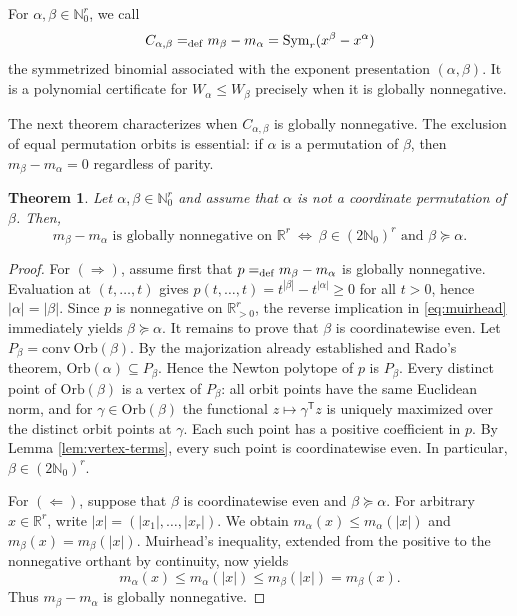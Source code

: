 \documentclass[11pt]{article}
\newtheorem{theorem}[definition]{Theorem}
\newcommand{\Nat}{\mathbb{N}}
\newcommand{\Real}{\mathbb{R}}
\newcommand{\conv}{\mathrm{conv}}
\newcommand{\Orb}{\mathrm{Orb}}
\theoremstyle{remark}
\begin{document}
For $\alpha,\beta\in\mathbb N_0^r$, we call
\[
 C_{\alpha,\beta}
 =_{\rm def} m_\beta-m_\alpha
 =\operatorname{Sym}_r(x^\beta-x^\alpha)
\]
the symmetrized binomial associated with the exponent
presentation $(\alpha,\beta)$. It is a polynomial certificate for
$W_\alpha\leq W_\beta$ precisely when it is globally nonnegative.

The next theorem characterizes when $C_{\alpha,\beta}$ is globally nonnegative.
The exclusion of equal permutation orbits is essential: if $\alpha$ is a permutation of $\beta$, then $m_\beta-m_\alpha=0$ regardless of parity.

\begin{theorem}
\label{thm:characterization}
Let $\alpha,\beta\in\Nat_0^r$ and assume that $\alpha$ is not a coordinate permutation of $\beta$.  Then, 
\[
m_\beta-m_\alpha \textrm{ is globally nonnegative on $\Real^r$}
~\Longleftrightarrow~ 
\beta\in(2\Nat_0)^r \textrm{ and $\beta\succeq\alpha$}.
\]
\end{theorem}

\begin{proof}
For $(\Rightarrow)$, assume first that $p=_{\rm def} m_\beta-m_\alpha$ is globally nonnegative. Evaluation at $(t,\ldots,t)$ gives
$p(t,\ldots,t)=t^{|\beta|}-t^{|\alpha|}\geq 0$ for all $t>0$, 
hence $|\alpha|=|\beta|$.  Since $p$ is nonnegative on
$\Real_{>0}^r$, the reverse implication in \eqref{eq:muirhead}
immediately yields $\beta\succeq\alpha$.
It remains to prove that $\beta$ is coordinatewise even.
Let $P_\beta=\conv\ \Orb(\beta)$.  By the majorization already
established and Rado's theorem, $\Orb(\alpha)\subseteq P_\beta$. Hence the Newton polytope of $p$ is $P_\beta$.  Every distinct point of $\Orb(\beta)$ is a vertex of $P_\beta$: all orbit points have the same Euclidean norm, and for
$\gamma\in\Orb(\beta)$ the functional $z\mapsto\gamma^{\mathsf T}z$ is uniquely maximized over the distinct orbit points at $\gamma$.  Each such
point has a positive coefficient in $p$.  By Lemma
\ref{lem:vertex-terms}, every such point is coordinatewise even.  In
particular, $\beta\in(2\Nat_0)^r$.

For $(\Leftarrow)$, suppose that $\beta$ is coordinatewise even and $\beta\succeq\alpha$.  For arbitrary $x\in\Real^r$, write
$|x|=(|x_1|,\ldots,|x_r|)$. We obtain $m_\alpha(x)\leq m_\alpha(|x|)$ and $m_\beta(x)=m_\beta(|x|)$.
Muirhead's inequality, extended from the positive to the nonnegative orthant by continuity, now yields
\[
  m_\alpha(x)
  \leq m_\alpha(|x|)
  \leq m_\beta(|x|)
  =m_\beta(x).
\]
Thus $m_\beta-m_\alpha$ is globally nonnegative.
\end{proof}
\end{document}
